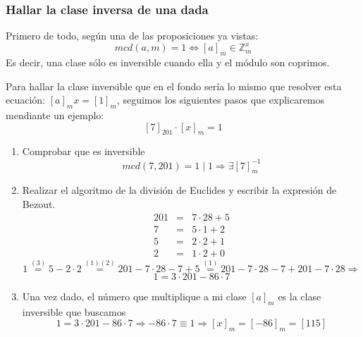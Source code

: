 \documentclass[10pt,a4paper,openright]{book}
\theoremstyle{break}
\begin{document}
\subsubsection*{Hallar la clase inversa de una dada}
Primero de todo, según una de las proposiciones ya vistas:
$$mcd(a,m)=1\Leftrightarrow [a]_m\in \mathbb Z_m^x$$
Es decir, una clase sólo es inversible cuando ella y el módulo son coprimos.\par
Para hallar la clase inversible que en el fondo sería lo mismo que resolver esta ecuación: $[a]_mx=[1]_m$, seguimos los siguientes pasos que explicaremos mendiante un ejemplo:
$$[7]_{201}\cdot [x]_m=1$$
\begin{enumerate}
\item Comprobar que es inversible
$$mcd(7,201)=1\mid 1\Rightarrow \exists [7]_m^{-1}$$
\item Realizar el algoritmo de la división de Euclides y escribir la expresión de Bezout.
\begin{eqnarray}
201 &=& 7\cdot 28 + 5 \\
7   &=& 5\cdot 1 + 2 \\
5   &=& 2\cdot 2 + 1 \\
2	&=& 1\cdot 2 + 0
\end{eqnarray}
$$1\stackrel{(3)}{=}5-2\cdot 2\stackrel{(1)(2)}{=}201-7\cdot 28-7+5\stackrel{(1)}{=}201-7\cdot 28-7+201-7\cdot 28\Rightarrow$$
$$1=3\cdot 201 -86\cdot 7$$
\item Una vez dado, el número que multiplique a mi clase $[a]_m$ es la clase inversible que buscamos
$$1=3\cdot 201 -86\cdot 7\Rightarrow -86\cdot 7\equiv 1\Rightarrow [x]_m=[-86]_m=[115]$$
\end{enumerate}
\end{document}
